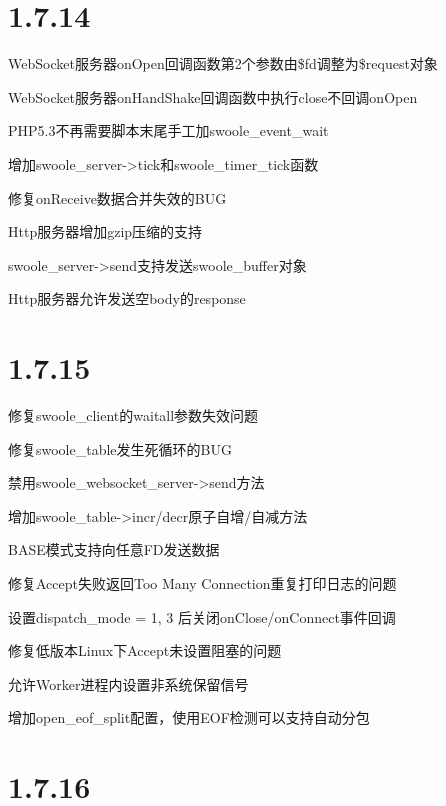 \section{1.7.14}


\begin{compactitem}
\item WebSocket服务器onOpen回调函数第2个参数由\$fd调整为\$request对象
\item WebSocket服务器onHandShake回调函数中执行close不回调onOpen
\item PHP5.3不再需要脚本末尾手工加swoole\_event\_wait
\item 增加swoole\_server->tick和swoole\_timer\_tick函数
\item 修复onReceive数据合并失效的BUG
\item Http服务器增加gzip压缩的支持
\item swoole\_server->send支持发送swoole\_buffer对象
\item Http服务器允许发送空body的response
\end{compactitem}



\section{1.7.15}



\begin{compactitem}
\item 修复swoole\_client的waitall参数失效问题
\item 修复swoole\_table发生死循环的BUG
\item 禁用swoole\_websocket\_server->send方法
\item 增加swoole\_table->incr/decr原子自增/自减方法
\item BASE模式支持向任意FD发送数据
\item 修复Accept失败返回Too Many Connection重复打印日志的问题
\item 设置dispatch\_mode = 1, 3 后关闭onClose/onConnect事件回调
\item 修复低版本Linux下Accept未设置阻塞的问题
\item 允许Worker进程内设置非系统保留信号
\item 增加open\_eof\_split配置，使用EOF检测可以支持自动分包
\end{compactitem}


\section{1.7.16}


